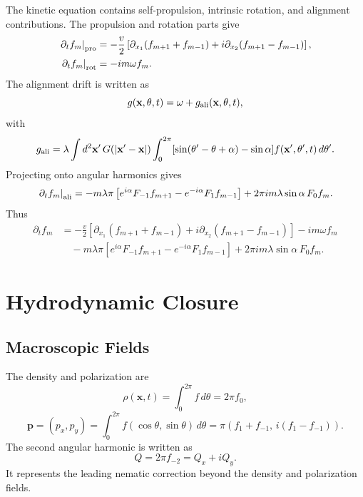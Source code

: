 \documentclass[11pt]{article}
\numberwithin{equation}{section}
\begin{document}
The kinetic equation contains self-propulsion, intrinsic rotation, and
alignment contributions. The propulsion and rotation parts give
\begin{align}
  \left.\partial_t f_m\right|_{\rm pro}
  &=
  -\frac{v}{2}\left[
  \partial_{x_1}(f_{m+1}+f_{m-1})
  +i\partial_{x_2}(f_{m+1}-f_{m-1})
  \right],\\
  \left.\partial_t f_m\right|_{\rm rot}
  &=-im\omega f_m .
\end{align}
The alignment drift is written as
\begin{equation}
  g(\mathbf x,\theta,t)=\omega+g_{\rm ali}(\mathbf x,\theta,t),
\end{equation}
with
\begin{equation}
  g_{\rm ali}=
  \lambda\int d^2\mathbf x'\,G(|\mathbf x'-\mathbf x|)
  \int_0^{2\pi}
  [\sin(\theta'-\theta+\alpha)-\sin\alpha]
  f(\mathbf x',\theta',t)\,d\theta' .
\end{equation}
Projecting onto angular harmonics gives
\begin{equation}
  \left.\partial_t f_m\right|_{\rm ali}
  =
  -m\lambda\pi\left[
  e^{i\alpha}F_{-1}f_{m+1}
  -e^{-i\alpha}F_1f_{m-1}
  \right]
  +2\pi i m\lambda\sin\alpha\,F_0f_m .
\end{equation}
Thus
\begin{align}
  \partial_t f_m
  &=
  -\frac{v}{2}\left[
  \partial_{x_1}(f_{m+1}+f_{m-1})
  +i\partial_{x_2}(f_{m+1}-f_{m-1})
  \right]
  -im\omega f_m \nonumber\\
  &\quad
  -m\lambda\pi\left[
  e^{i\alpha}F_{-1}f_{m+1}
  -e^{-i\alpha}F_1f_{m-1}
  \right]
  +2\pi i m\lambda\sin\alpha\,F_0f_m .
  \label{eq:mode_equation}
\end{align}

\section{Hydrodynamic Closure}

\subsection{Macroscopic Fields}

The density and polarization are
\begin{equation}
  \rho(\mathbf x,t)=\int_0^{2\pi}f\,d\theta=2\pi f_0,
\end{equation}
\begin{equation}
  \mathbf p=(p_x,p_y)=
  \int_0^{2\pi}f(\cos\theta,\sin\theta)\,d\theta
  =
  \pi(f_1+f_{-1},\,i(f_1-f_{-1})).
\end{equation}
The second angular harmonic is written as
\begin{equation}
  Q=2\pi f_{-2}=Q_x+iQ_y .
\end{equation}
It represents the leading nematic correction beyond the density and
polarization fields.
\end{document}
